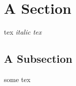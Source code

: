 \documentclass{article}%
\begin{document}
%
\normalsize%
\section{A Section}%
\label{sec:A Section}%
tex%
\textit{italic tex}%
\subsection{A Subsection}%
\label{subsec:A Subsection}%
some tex

%
\end{document}
